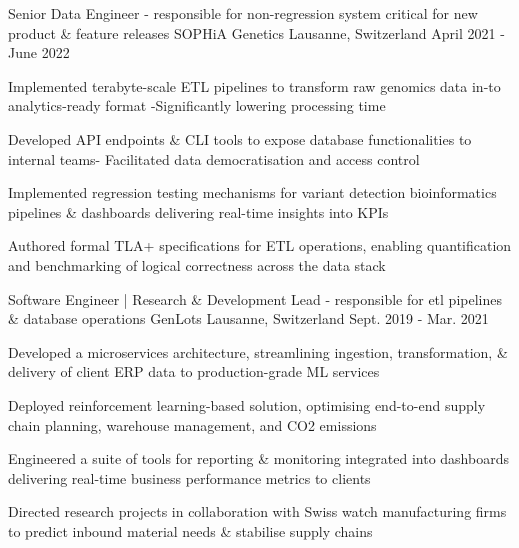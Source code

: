 \begin{cventries}
 \cventry
    {Senior Data Engineer - responsible for non-regression system critical for new product \& feature releases} %
    {SOPHiA Genetics} %
    {Lausanne, Switzerland} %
    {April 2021 - June 2022} %
    {
      \begin{cvitems} %
        \item {Implemented terabyte-scale ETL pipelines to transform raw genomics data in-to analytics-ready format -Significantly lowering processing time}
        \item {Developed API endpoints \& CLI tools to expose database functionalities to internal teams- Facilitated data democratisation and access control}
        \item {Implemented regression testing mechanisms for variant detection bioinformatics pipelines \& dashboards delivering real-time insights into KPIs}
        \item {Authored formal TLA+ specifications for ETL operations, enabling quantification and benchmarking of logical correctness across the data stack}
      \end{cvitems}
    }
    
    \vspace{-0.1cm}

  \cventry
    {Software Engineer | Research \& Development Lead - responsible for etl pipelines \& database operations} %
    {GenLots} %
    {Lausanne, Switzerland} %
    {Sept. 2019 - Mar. 2021} %
    {
      \begin{cvitems} %
        \item {Developed a microservices architecture, streamlining ingestion, transformation, \& delivery of client ERP data to production-grade ML services}
      	\item {Deployed reinforcement learning-based solution, optimising end-to-end supply chain planning, warehouse management, and CO2 emissions}
        \item {Engineered a suite of tools for reporting \& monitoring integrated into dashboards delivering real-time business performance metrics to clients}
        \item {Directed research projects in collaboration with Swiss watch manufacturing firms to predict inbound material needs \& stabilise supply chains}
      \end{cvitems}
    } 
   

\end{cventries}

